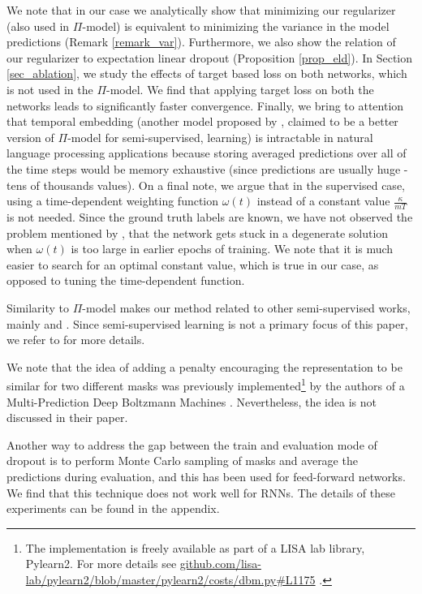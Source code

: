 \documentclass{article} %
\begin{document}
We note that in our case we analytically show that minimizing our regularizer (also used in $\Pi$-model) is equivalent to minimizing the variance in the model predictions (Remark \ref{remark_var}). Furthermore, we also show the relation of our regularizer to expectation linear dropout (Proposition \ref{prop_eld}). In Section \ref{sec_ablation}, we study the effects of target based loss on both networks, which is not used in the $\Pi$-model. We find that applying target loss on both the networks leads to significantly faster convergence. Finally, we bring to attention that temporal embedding (another model proposed by \citet{laine2016temporal}, claimed to be a better version of $\Pi$-model for semi-supervised, learning) is intractable in natural language processing applications because storing averaged predictions over all of the time steps would be memory exhaustive (since predictions are usually huge - tens of thousands values). On a final note, we argue that in the supervised case, using a time-dependent weighting function $\omega(t)$ instead of a constant value $\frac{\kappa}{mT}$ is not needed. Since the ground truth labels are known, we have not observed the problem mentioned by \citet{laine2016temporal}, that the network gets stuck in a degenerate solution when $\omega(t)$ is too large in earlier epochs of training. We note that it is much easier to search for an optimal constant value, which is true in our case, as opposed to tuning the time-dependent function.

Similarity to $\Pi$-model makes our method related to other semi-supervised works, mainly \cite{ladder} and \cite{sajjadi2016regularization}. Since semi-supervised learning is not a primary focus of this paper, we refer to \cite{laine2016temporal} for more details.

We note that the idea of adding a penalty encouraging the representation to be similar for two different masks was previously implemented\footnote{The implementation is freely available as part of a LISA lab library, Pylearn2. For more details see \url{github.com/lisa-lab/pylearn2/blob/master/pylearn2/costs/dbm.py\#L1175} .} by the authors of a Multi-Prediction Deep Boltzmann Machines \citep{goodfellow2013multi}. Nevertheless, the idea is not discussed in their paper.

Another way to address the gap between the train and evaluation mode of dropout is to perform Monte Carlo sampling of masks and average the predictions during evaluation, and this has been used for feed-forward networks. We find that this technique does not work well for RNNs. The details of these experiments can be found in the appendix. 
\end{document}
